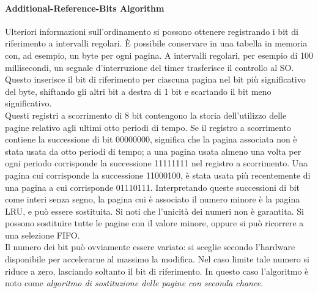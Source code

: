 \documentclass{article}
\begin{document}
				\paragraph{Additional-Reference-Bits Algorithm\\}
					Ulteriori informazioni sull’ordinamento si possono ottenere registrando i bit di riferimento a intervalli regolari. È possibile conservare in una tabella in memoria con, ad esempio, un byte per ogni pagina. A intervalli regolari, per esempio di 100 millisecondi, un segnale d’interruzione del timer trasferisce il controllo al SO. Questo inserisce il bit di riferimento per ciascuna pagina nel bit più significativo del byte, shiftando gli altri bit a destra di 1 bit e scartando il bit meno significativo.
					\\Questi registri a scorrimento di 8 bit contengono la storia dell’utilizzo delle pagine relativo agli ultimi otto periodi di tempo. Se il registro a scorrimento contiene la successione di bit 00000000, significa che la pagina associata non è stata usata da otto periodi di tempo; a una pagina usata almeno una volta per ogni periodo corrisponde la successione 11111111 nel registro a scorrimento. Una pagina cui corrisponde la successione 11000100, è stata usata più recentemente di una pagina a cui corrisponde 01110111. Interpretando queste successioni di bit come interi senza segno, la pagina cui è associato il numero minore è la pagina LRU, e può essere sostituita. Si noti che l’unicità dei numeri non è garantita. Si possono sostituire tutte le pagine con il valore minore, oppure si può ricorrere a una selezione FIFO.
					\\Il numero dei bit può ovviamente essere variato: si sceglie secondo l’hardware disponibile per accelerarne al massimo la modifica. Nel caso limite tale numero si riduce a zero, lasciando soltanto il bit di riferimento. In questo caso l’algoritmo è noto come \textit{algoritmo di sostituzione delle pagine con seconda chance}.
\end{document}

